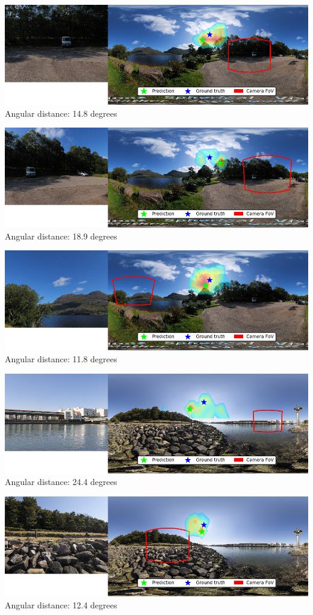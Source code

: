 \begin{multicols}{2}
\includegraphics[width=\mywidth]{pano_aaihqlchfeptuj_003.jpg}\\
Angular distance: 14.8 degrees

\includegraphics[width=\mywidth]{pano_aaihqlchfeptuj_004.jpg}\\
Angular distance: 18.9 degrees

\includegraphics[width=\mywidth]{pano_aaihqlchfeptuj.jpg}\\
Angular distance: 11.8 degrees

\includegraphics[width=\mywidth]{pano_aakgxuckdrzzpz.jpg}\\
Angular distance: 24.4 degrees

\includegraphics[width=\mywidth]{pano_aakgxuckdrzzpz_003.jpg}\\
Angular distance: 12.4 degrees


\end{multicols}
